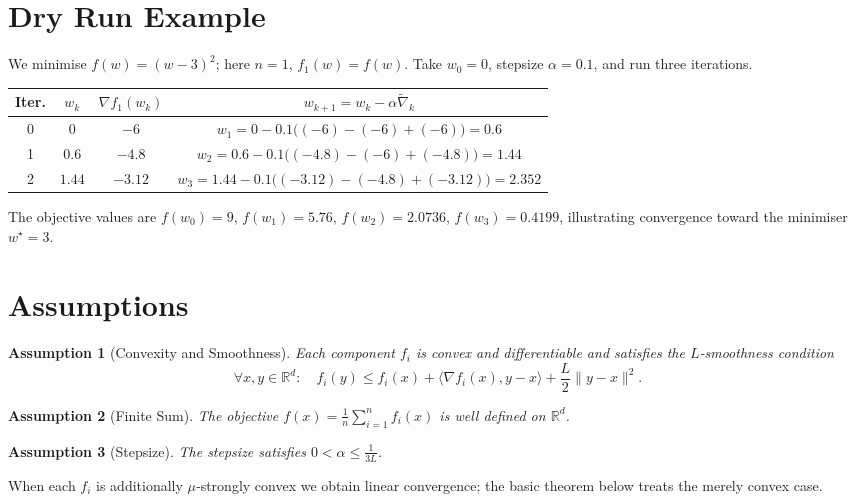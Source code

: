 \documentclass{article}
\newtheorem{assumption}{Assumption}
\newcommand{\R}{\mathbb{R}}
\begin{document}
\section*{Dry Run Example}
We minimise $f(w)=(w-3)^2$; here $n=1$, $f_1(w)=f(w)$.  
Take $w_0=0$, stepsize $\alpha=0.1$, and run three iterations.

\begin{center}
\begin{tabular}{c|c|c|c}
\textbf{Iter.}&$w_k$&$\nabla f_1(w_k)$&$w_{k+1}=w_k-\alpha\widetilde\nabla_k$\\ \hline
0&$0$&$-6$&$\displaystyle w_1=0-0.1\bigl((-6)-(-6)+(-6)\bigr)=0.6$\\
1&$0.6$&$-4.8$&$\displaystyle w_2=0.6-0.1\bigl((-4.8)-(-6)+(-4.8)\bigr)=1.44$\\
2&$1.44$&$-3.12$&$\displaystyle w_3=1.44-0.1\bigl((-3.12)-(-4.8)+(-3.12)\bigr)=2.352$\\
\end{tabular}
\end{center}
The objective values are $f(w_0)=9$, $f(w_1)=5.76$, $f(w_2)=2.0736$, $f(w_3)=0.4199$, illustrating convergence toward the minimiser $w^\star=3$.

\section*{Assumptions}
\begin{assumption}[Convexity and Smoothness]\label{ass:convex-smooth}
Each component $f_i$ is convex and differentiable and satisfies the $L$‑smoothness condition
\[
\forall x,y\in\R^{d}:\quad 
f_i(y)\le f_i(x)+\langle \nabla f_i(x),y-x\rangle+\frac{L}{2}\|y-x\|^{2}.
\tag{4}
\]
\end{assumption}
\begin{assumption}[Finite Sum]\label{ass:finite}
The objective $f(x)=\frac1n\sum_{i=1}^{n}f_i(x)$ is well defined on $\R^{d}$.
\end{assumption}
\begin{assumption}[Stepsize]\label{ass:stepsize}
The stepsize satisfies $0<\alpha\le\frac{1}{3L}$.
\end{assumption}
When each $f_i$ is additionally $\mu$‑strongly convex we obtain linear convergence; the basic theorem below treats the merely convex case.
\end{document}
